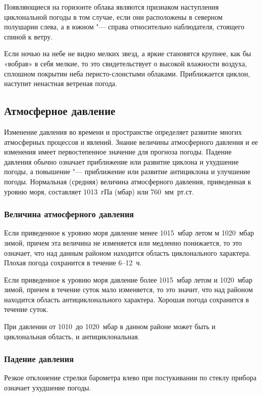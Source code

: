  Появляющиеся на горизонте облака являются признаком наступления
циклональной погоды в том случае, если они расположены в северном
полушарии слева, а в южном "--- справа относительно наблюдателя, стоящего
спиной к ветру.

 Если ночью на небе не видно мелких звезд, а яркие становятся
крупнее, как бы «вобрав» в себя мелкие, то это свидетельствует о
высокой влажности воздуха, сплошном покрытии неба перисто-слоистыми
облаками. Приближается циклон, наступит ненастная ветреная погода.

\subsection{Атмосферное давление}

Изменение давления во времени и пространстве определяет развитие
многих атмосферных процессов и явлений. Знание величины атмосферного
давления и ее изменения имеет первостепенное значение для прогноза
погоды. Падение давления обычно означает приближение или развитие
циклона и ухудшение погоды, а повышение "--- приближение или развитие
антициклона и улучшение погоды. Нормальная (средняя) величина
атмосферного давления, приведенная к уровню моря, составляет 1013~гПа
(мбар) или 760~мм~рт.ст.

\subsubsection{Величина атмосферного давления}

 Если приведенное к уровню моря давление менее 1015~мбар летом
м 1020~мбар зимой, причем эта величина не изменяется или медленно
понижается, то это означает, что над данным районом находится область
циклонального характера. Плохая погода сохранится в течение 6--12~ч.

 Если приведенное к уровню моря давление более 1015~мбар летом
и 1020~мбар зимой, причем в течение суток мало изменяется, то это
значит, что над районом находится область антициклонального
характера. Хорошая погода сохранится в течение суток.

 При давлении от 1010~до 1020~мбар в данном районе может быть и
циклональная область, и антициклональная.

\subsubsection{Падение давления}

 Резкое отклонение стрелки барометра влево при постукивании по
стеклу прибора означает ухудшение погоды.

